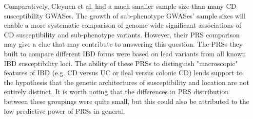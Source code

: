 Comparatively, Cleynen et al. had a much smaller sample size than many CD susceptibility GWASes. The growth of sub-phenotype GWASes' sample sizes will enable a more systematic comparison of genome-wide significant associations of CD susceptibility and sub-phenotype variants. However, their PRS comparison may give a clue that may contribute to answering this question. The PRSs they built to compare different IBD forms were based on lead variants from all known IBD susceptibility loci. The ability of these PRSs to distinguish "macroscopic" features of IBD (e.g. CD versus UC or ileal versus colonic CD) lends support to the hypothesis that the genetic architectures of susceptibility and location are not entirely distinct. It is worth noting that the differences in PRS distribution between these groupings were quite small, but this could also be attributed to the low predictive power of PRSs in general.\\

